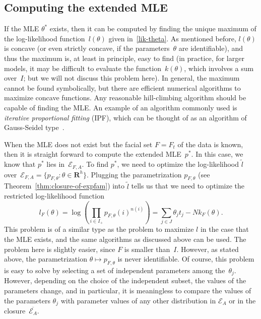 \documentclass[aos,noinfoline]{imsart}
\def\R{{\mathbf R}}
\newcommand{\Ecal}{\mathcal{E}}
\newcommand{\ol}[1]{\overline{#1}}
\theoremstyle{remark}
\theoremstyle{definition}
\begin{document}
\subsection{Computing the extended MLE}
\label{sec:computingemle}
If the MLE $\theta^{*}$ exists, then it can be computed by finding the unique maximum of the log-likelihood
function~$l(\theta)$ given in~\eqref{lik-theta}.  As mentioned before, $l(\theta)$ is concave (or even strictly concave,
if the parameters~$\theta$ are identifiable), and thus the maximum is, at least in principle, easy to find (in practice,
for larger models, it may be difficult to evaluate the function~$k(\theta)$, which involves a sum over~$I$; but we will
not discuss this problem here).  In general, the maximum cannot be found symbolically, but there are efficient numerical
algorithms to maximize concave functions.  Any reasonable hill-climbing algorithm should be capable of finding the MLE.
An example of an algorithm commonly used is \emph{iterative proportional fitting} (IPF), which can be thought of as an
algorithm of Gauss-Seidel type~\citep{CsiszarShields04:Information_Theory_and_Statistics}.

When the MLE does not exist but the facial set $F=F_{t}$ of the data is known, then it is straight forward to compute
the extended MLE~$p^{*}$.  In this case, we know that $p^{*}$ lies in~$\Ecal_{F,A}$.  To find $p^{*}$, we need to
optimize the log-likelihood $\tilde l$ over~$\Ecal_{F,A}=\{p_{F,\theta}:\theta\in\R^{h}\}$.  Plugging the
parametrization $p_{F,\theta}$ (see Theorem~\ref{thm:closure-of-expfam}) into $\tilde l$ tells us that we need to
optimize the restricted log-likelihood function
\begin{equation}
  \label{eq:likelihood-on-face}
  l_{F}(\theta) = \log(\prod_{i\in I_{+}}p_{F,\theta}(i)^{n(i)}) = \sum_{j\in J}\theta_{j}t_{j} - N k_{F}(\theta).
\end{equation}
This problem is of a similar type as the problem to maximize $l$ in the case that the MLE exists, and the same
algorithms as discussed above can be used.  The problem here is slightly easier, since $F$ is smaller than~$I$.
However, %
as stated above, the parametrization $\theta\mapsto p_{F,\theta}$ is never identifiable.  Of course, this problem is
easy to solve by selecting a set of independent parameters among the~$\theta_{j}$.
However, depending on the choice of the independent subset, the values of the
parameters change, and in particular, it is meaningless to compare the values of the parameters $\theta_{j}$ with
parameter values of any other distribution in $\Ecal_{A}$ or in the closure~$\ol{\Ecal_{A}}$.
\end{document}
